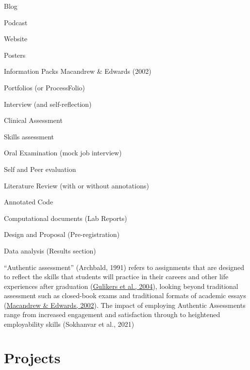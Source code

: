 \documentclass[
  11pt,
  letterpaper,
  oneside,
  open=any]{scrbook}
\begin{document}
\begin{tcolorbox}[enhanced jigsaw, rightrule=.15mm, opacitybacktitle=0.6, colbacktitle=quarto-callout-note-color!10!white, breakable, leftrule=.75mm, bottomtitle=1mm, toptitle=1mm, colback=white, titlerule=0mm, opacityback=0, title=\textcolor{quarto-callout-note-color}{\faInfo}\hspace{0.5em}{assessment types}, arc=.35mm, bottomrule=.15mm, toprule=.15mm, left=2mm, coltitle=black]

Blog

Podcast

Website

Posters

Information Packs Macandrew \& Edwards (2002)

Portfolios (or ProcessFolio)

Interview (and self-reflection)

Clinical Assessment

Skills assessment

Oral Examination (mock job interview)

Self and Peer evaluation

Literature Review (with or without annotations)

Annotated Code

Computational documents (Lab Reports)

Design and Proposal (Pre-registration)

Data analysis (Results section)

\end{tcolorbox}

``Authentic assessment'' (Archbald, 1991) refers to assignments that are
designed to reflect the skills that students will practice in their
careers and other life experiences after graduation
(\href{https://journals-sagepub-com.gold.idm.oclc.org/doi/full/10.1177/00986283211027278\#bibr24-00986283211027278}{Gulikers
et al., 2004}), looking beyond traditional assessment such as
closed-book exams and traditional formats of academic essays
(\href{https://journals-sagepub-com.gold.idm.oclc.org/doi/full/10.1177/00986283211027278\#bibr44-00986283211027278}{Macandrew
\& Edwards, 2002}). The impact of employing Authentic Assessments range
from increased engagement and satisfaction through to heightened
employability skills (Sokhanvar et al., 2021)

\hypertarget{projects}{%
\section{Projects}\label{projects}}
\end{document}
